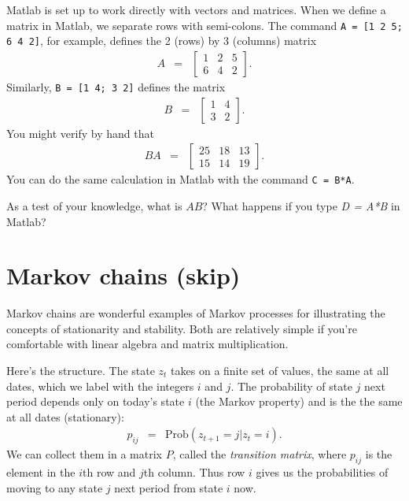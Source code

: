 \documentclass[11pt]{article}
\begin{document}
Matlab is set up to work directly with vectors and matrices.
When we define a matrix in Matlab, we separate rows with semi-colons.
The command {\tt A = [1 2 5; 6 4 2]}, for example,
defines the 2 (rows) by 3 (columns) matrix
\begin{eqnarray*}
    A &=& \left[
            \begin{array}{ccc}
            1 & 2 & 5 \\ 6 & 4 & 2
            \end{array}
            \right] .
\end{eqnarray*}
Similarly, {\tt B = [1 4; 3 2]} defines the matrix
\begin{eqnarray*}
    B &=& \left[
            \begin{array}{ccc}
            1 & 4 \\  3 & 2
            \end{array}
            \right] .
\end{eqnarray*}
You might verify by hand that
\begin{eqnarray*}
    BA &=& \left[
            \begin{array}{ccc}
            25 & 18 & 13 \\  15 & 14  & 19
            \end{array}
            \right] .
\end{eqnarray*}
You can do the same calculation in Matlab with the command
{\tt C = B*A}.

As a test of your knowledge, what is $A B$?
What happens if you type {\it D = A*B} in Matlab?


\section{Markov chains (skip)}

Markov chains are wonderful examples of Markov processes
for illustrating the concepts of stationarity and stability.
Both are relatively simple if you're comfortable with linear algebra
and matrix multiplication.


Here's the structure.
The state $z_t$ takes on a finite set of values, the same at all dates,
which we label with the integers $i$ and $j$.
The probability of state $j$ next period depends only on today's state $i$
(the Markov property) and is the the same at all dates (stationary):
\begin{eqnarray*}
    p_{ij} &=& \mbox{Prob} (z_{t+1} = j | z_t = i) .
\end{eqnarray*}
We can collect them in a matrix $P$, called the {\it transition matrix\/},
where $p_{ij}$ is the element in the $i$th row and $j$th column.
Thus  row $i$ gives us the probabilities of moving to any state $j$
next period from state $i$ now.
\end{document}
